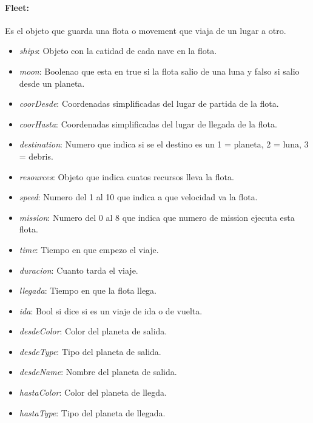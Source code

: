 \documentclass{article}
\begin{document}
\paragraph{Fleet:} Es el objeto que guarda una flota o movement que viaja de un lugar a otro.
\vspace{-5mm}
\begin{itemize}[noitemsep]
    \item \textit{ships}: Objeto con la catidad de cada nave en la flota.
    \item \textit{moon}: Boolenao que esta en true si la flota salio de una luna y falso si salio desde un planeta.
    \item \textit{coorDesde}: Coordenadas simplificadas del lugar de partida de la flota.
    \item \textit{coorHasta}: Coordenadas simplificadas del lugar de llegada de la flota.
    \item \textit{destination}: Numero que indica si se el destino es un 1 = planeta, 2 = luna, 3 = debris.
    \item \textit{resources}: Objeto que indica cuatos recursos lleva la flota.
    \item \textit{speed}: Numero del 1 al 10 que indica a que velocidad va la flota.
    \item \textit{mission}: Numero del 0 al 8 que indica que numero de mission ejecuta esta flota.
    \item \textit{time}: Tiempo en que empezo el viaje.
    \item \textit{duracion}: Cuanto tarda el viaje.
    \item \textit{llegada}: Tiempo en que la flota llega.
    \item \textit{ida}: Bool si dice si es un viaje de ida o de vuelta.
    \item \textit{desdeColor}: Color del planeta de salida. 
    \item \textit{desdeType}: Tipo del planeta de salida.
    \item \textit{desdeName}: Nombre del planeta de salida.
    \item \textit{hastaColor}: Color del planeta de llegda.
    \item \textit{hastaType}: Tipo del planeta de llegada.
\end{itemize}
\end{document}
